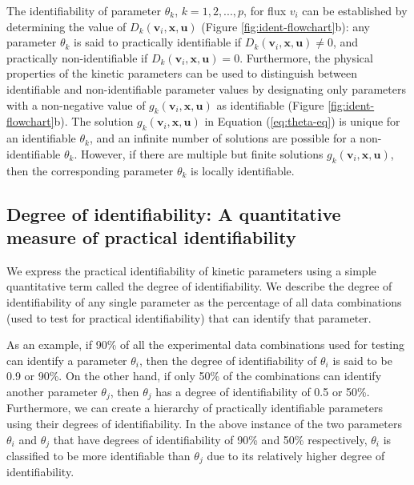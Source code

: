 \documentclass[10pt]{article}
\begin{document}
	The identifiability of parameter $\theta_k$, $k = {1, 2, ..., p}$, for flux $v_i$ can be established by determining the value of $D_k(\mathbf{v}_i, \mathbf{x}, \mathbf{u})$ (Figure \ref{fig:ident-flowchart}b): any parameter $\theta_k$ is said to practically identifiable if $D_k(\mathbf{v}_i, \mathbf{x}, \mathbf{u})\neq0$, and practically non-identifiable if $D_k(\mathbf{v}_i, \mathbf{x}, \mathbf{u}) = 0$. Furthermore, the physical properties of the kinetic parameters can be used to distinguish between identifiable and non-identifiable parameter values by designating only parameters with a non-negative value of $g_k(\mathbf{v}_i, \mathbf{x}, \mathbf{u})$ as identifiable (Figure \ref{fig:ident-flowchart}b). The solution $g_k(\mathbf{v}_i, \mathbf{x}, \mathbf{u})$ in Equation (\ref{eq:theta-eq}) is unique for an identifiable $\theta_k$, and an infinite number of solutions are possible for a non-identifiable $\theta_k$. However, if there are multiple but finite solutions $g_k(\mathbf{v}_i, \mathbf{x}, \mathbf{u})$, then the corresponding parameter $\theta_k$ is locally identifiable.
	
	
	\subsection{Degree of identifiability: A quantitative measure of practical identifiability}\label{sec:degree_of_identifiability}
	We express the practical identifiability of kinetic parameters using a simple quantitative term called the degree of identifiability. We describe the degree of identifiability of any single parameter as the percentage of all data combinations (used to test for practical identifiability) that can identify that parameter. 
	
	As an example, if 90\% of all the experimental data combinations used for testing can identify a parameter $\theta_i$, then the degree of identifiability of $\theta_i$ is said to be 0.9 or 90\%. On the other hand, if only 50\% of the combinations can identify another parameter $\theta_j$, then $\theta_j$ has a degree of identifiability of 0.5 or 50\%. Furthermore, we can create a hierarchy of practically identifiable parameters using their degrees of identifiability. In the above instance of the two parameters $\theta_i$ and $\theta_j$ that have degrees of identifiability of 90\% and 50\% respectively, $\theta_i$ is classified to be more identifiable than $\theta_j$ due to its relatively higher degree of identifiability. 
	
\end{document}
